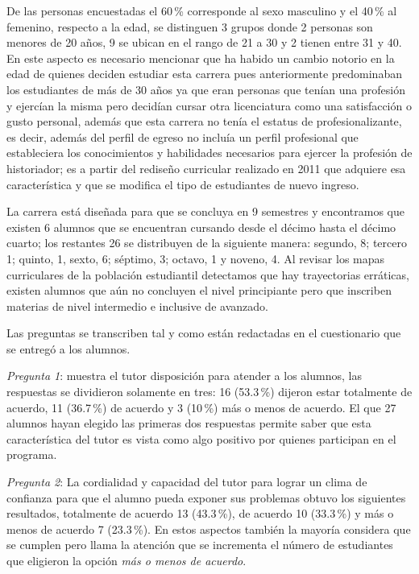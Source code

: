 De las personas encuestadas el 60\,\% corresponde al sexo masculino y  el 40\,\%
al femenino, respecto  a la edad, se distinguen 3 grupos donde 2 personas
son menores de 20 años, 9 se ubican en el rango de 21 a 30 y  2 tienen
entre  31 y 40. En este aspecto es necesario mencionar que ha habido un
cambio notorio en la edad de quienes deciden estudiar esta carrera pues
anteriormente predominaban los estudiantes de más de 30 años ya que eran
personas que tenían una profesión y ejercían la misma pero decidían cursar
otra licenciatura como una satisfacción o gusto personal, además que esta
carrera no tenía el estatus de profesionalizante, es decir, además del
perfil de egreso no incluía un perfil profesional que estableciera los
conocimientos y habilidades necesarios para ejercer la profesión de
historiador; es a partir del rediseño curricular  realizado en 2011 que
adquiere esa característica  y que se modifica el tipo de estudiantes de
nuevo ingreso.


La carrera está diseñada para que se concluya en 9 semestres y encontramos
que existen  6 alumnos que se encuentran cursando desde el décimo hasta el
décimo cuarto; los restantes 26 se distribuyen de la siguiente manera:
segundo, 8; tercero 1; quinto, 1, sexto, 6; séptimo, 3; octavo, 1 y noveno,
4. Al revisar los mapas curriculares de la población estudiantil detectamos
que hay trayectorias erráticas, existen alumnos que aún no concluyen el
nivel principiante pero que inscriben materias de nivel intermedio e
inclusive de avanzado.


Las preguntas se transcriben tal y como están redactadas en el cuestionario
que se entregó a los alumnos.


\textit{Pregunta 1}: muestra el tutor disposición para atender a los alumnos,
las respuestas se dividieron solamente en tres: 16 (53.3\,\%) dijeron estar
totalmente de acuerdo, 11 (36.7\,\%) de acuerdo y 3 (10\,\%) más o menos de
acuerdo. El que 27 alumnos hayan elegido las primeras dos respuestas
permite saber que esta característica del tutor es vista como algo positivo
por quienes participan en el programa.


\textit{Pregunta 2}: La cordialidad y capacidad del tutor para lograr un
clima de confianza para que el alumno pueda exponer sus problemas obtuvo
los siguientes resultados, totalmente de acuerdo 13 (43.3\,\%), de acuerdo 10
(33.3\,\%) y más o menos de acuerdo 7 (23.3\,\%). En estos aspectos también la
mayoría considera que se cumplen pero llama la atención que se incrementa
el número de estudiantes que eligieron la opción \textit{más o menos de
acuerdo}.


